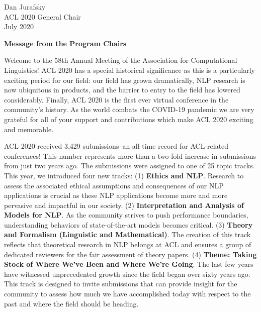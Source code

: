 \documentclass[11pt]{article}
\begin{document}
\bigskip
\noindent Dan Jurafsky\\
\noindent ACL 2020 General Chair\\
\noindent July 2020\\


\pagebreak

\begin{center}
  {\Large \bf Message from the Program Chairs}
\end{center}

Welcome to the 58th Annual Meeting of the Association for Computational Linguistics! ACL 2020 has a special historical significance as this is a particularly exciting period for our field: our field has grown dramatically, NLP research is now ubiquitous in products, and the barrier to entry to the field has lowered considerably.  Finally, ACL 2020 is the first ever virtual conference in the community's history. As the world combats the COVID-19 pandemic we are very grateful for all of your support and contributions which make ACL 2020 exciting and memorable. 

ACL 2020 received 3,429 submissions--an all-time record for ACL-related conferences!  This number represents more than a two-fold increase in submissions from just two years ago.
The submissions were assigned to one of 25 topic tracks. This year, we introduced four new tracks:  (1) \textbf{Ethics and NLP}. Research to assess the associated ethical assumptions and consequences of our NLP applications is crucial as these NLP applications become more and more pervasive and impactful in our society.  (2) \textbf{Interpretation and Analysis of Models for NLP}.  As the community strives to push performance boundaries, understanding behaviors of state-of-the-art models becomes critical. (3) \textbf{Theory and Formalism (Linguistic and Mathematical)}. The creation of this track reflects that theoretical research in NLP belongs at ACL and ensures a group of dedicated reviewers for the fair assessment of theory papers.  
(4) \textbf{Theme: Taking Stock of Where We've Been and Where We're Going}. The last few years have witnessed unprecedented growth since the field began over sixty years ago. This track is designed to invite submissions that can provide insight for the community to assess how much we have accomplished today with respect to the past and where the field should be heading.
\end{document}

